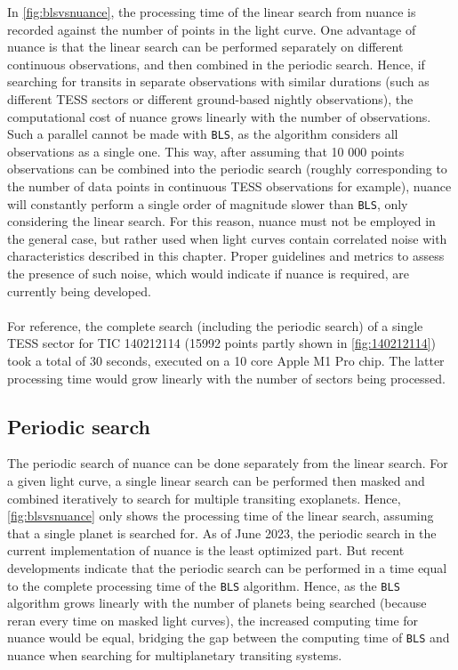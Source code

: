 \documentclass{aastex631}
\begin{document}
\noindent In \autoref{fig:blsvsnuance}, the processing time of the linear search from \textsf{nuance} is recorded against the number of points in the light curve. One advantage of \textsf{nuance} is that the linear search can be performed separately on different continuous observations, and then combined in the periodic search. Hence, if searching for transits in separate observations with similar durations (such as different TESS sectors or different ground-based nightly observations), the computational cost of \textsf{nuance} grows linearly with the number of observations. Such a parallel cannot be made with \texttt{BLS}, as the algorithm considers all observations as a single one. This way, after assuming that 10 000 points observations can be combined into the periodic search (roughly corresponding to the number of data points in continuous TESS observations for example), \textsf{nuance} will constantly perform a single order of magnitude slower than \texttt{BLS}, only considering the linear search. For this reason, \textsf{nuance} must not be employed in the general case, but rather used when light curves contain correlated noise with characteristics described in this chapter. Proper guidelines and metrics to assess the presence of such noise, which would indicate if \textsf{nuance} is required, are currently being developed.\\\\
For reference, the complete search (including the periodic search) of a single TESS sector for TIC 140212114 (15992 points partly shown in  \autoref{fig:140212114}) took a total of 30 seconds, executed on a 10 core Apple M1 Pro chip. The latter processing time would grow linearly with the number of sectors being processed.

\subsection*{Periodic search}

The periodic search of \textsf{nuance} can be done separately from the linear search. For a given light curve, a single linear search can be performed then masked and combined iteratively to search for multiple transiting exoplanets. Hence, \autoref{fig:blsvsnuance} only shows the processing time of the linear search, assuming that a single planet is searched for. As of June 2023, the periodic search in the current implementation of \textsf{nuance} is the least optimized part. But recent developments indicate that the periodic search can be performed in a time equal to the complete processing time of the \texttt{BLS} algorithm. Hence, as the \texttt{BLS} algorithm grows linearly with the number of planets being searched (because reran every time on masked light curves), the increased computing time for \textsf{nuance} would be equal, bridging the gap between the computing time of  \texttt{BLS} and \textsf{nuance} when searching for multiplanetary transiting systems.
\end{document}
